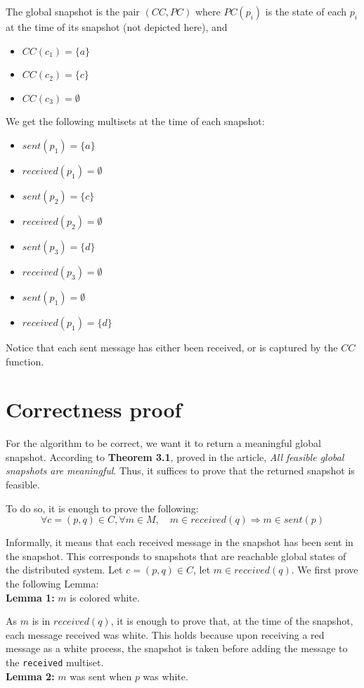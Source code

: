 \documentclass{article}
\begin{document}
The global snapshot is the pair $(CC,PC)$ where
$PC(p_i)$ is the state of each $p_i$ at the time of its snapshot (not depicted here), and
\begin{itemize}
\item $CC(c_1)=\{a\}$
\item $CC(c_2)=\{c\}$
\item $CC(c_3)=\emptyset$
\end{itemize}

We get the following multisets at the time of each snapshot:
\begin{itemize}
\item $\mathit{sent}(p_1)=\{a\}$
\item $\mathit{received}(p_1)=\emptyset$
\item $\mathit{sent}(p_2)=\{c\}$
\item $\mathit{received}(p_2)=\emptyset$
\item $\mathit{sent}(p_3)=\{d\}$
\item $\mathit{received}(p_3)=\emptyset$
\item $\mathit{sent}(p_1)=\emptyset$
\item $\mathit{received}(p_1)=\{d\}$
\end{itemize}
Notice that each sent message has either been received, or is captured by the $CC$ function.


\section{Correctness proof}

For the algorithm to be correct, we want it to return a meaningful global snapshot.
According to \textbf{Theorem 3.1}, proved in the article, \textit{All feasible global snapshots are meaningful}.
Thus, it suffices to prove that the returned snapshot is feasible.

To do so, it is enough to prove the following:
$$\forall c=(p,q)\in C, \forall m\in M,\quad m\in\mathit{received}(q)\Rightarrow m\in\mathit{sent}(p)$$

Informally, it means that each received message in the snapshot has been sent in the snapshot. This corresponds to snapshots that are reachable global states of the distributed system.
Let $c=(p,q)\in C$, let $m\in\mathit{received}(q)$.
We first prove the following Lemma:\\
\textbf{Lemma 1:} $m$ is colored white.

As $m$ is in $\mathit{received}(q)$, it is enough to prove that, at the time of the snapshot, each message received was white. This holds because upon receiving a red message as a white process, the snapshot is taken before adding the message to the \lstinline{received} multiset.\\
\textbf{Lemma 2:} $m$ was sent when $p$ was white.
\end{document}
